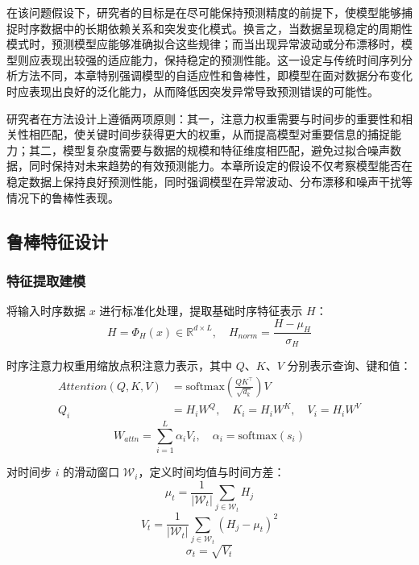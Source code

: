 在该问题假设下，研究者的目标是在尽可能保持预测精度的前提下，使模型能够捕捉时序数据中的长期依赖关系和突发变化模式。换言之，当数据呈现稳定的周期性模式时，预测模型应能够准确拟合这些规律；而当出现异常波动或分布漂移时，模型则应表现出较强的适应能力，保持稳定的预测性能。这一设定与传统时间序列分析方法不同，本章特别强调模型的自适应性和鲁棒性，即模型在面对数据分布变化时应表现出良好的泛化能力，从而降低因突发异常导致预测错误的可能性。

研究者在方法设计上遵循两项原则：其一，注意力权重需要与时间步的重要性和相关性相匹配，使关键时间步获得更大的权重，从而提高模型对重要信息的捕捉能力；其二，模型复杂度需要与数据的规模和特征维度相匹配，避免过拟合噪声数据，同时保持对未来趋势的有效预测能力。本章所设定的假设不仅考察模型能否在稳定数据上保持良好预测性能，同时强调模型在异常波动、分布漂移和噪声干扰等情况下的鲁棒性表现。

\subsection{鲁棒特征设计}\label{sec:ch3-robust-feature}

\subsubsection{特征提取建模}\label{subsec:ch3-feature-extraction}

将输入时序数据 \(x\) 进行标准化处理，提取基础时序特征表示 \(H\)：
\begin{equation}
H = \Phi_{H}(x) \in \mathbb{R}^{d \times L},\quad H_{norm} = \frac{H - \mu_H}{\sigma_H}
\tag{3-3}
\end{equation}

\noindent 时序注意力权重用缩放点积注意力表示，其中 \(Q\)、\(K\)、\(V\) 分别表示查询、键和值：
\begin{align}
Attention(Q, K, V) &= \text{softmax}\left(\frac{QK^{\top}}{\sqrt{d_k}}\right)V
\tag{3-4}\\
Q_i &= H_i W^Q,\quad K_i = H_i W^K,\quad V_i = H_i W^V
\tag{3-5}
\end{align}
\begin{equation}
W_{attn} = \sum_{i=1}^{L} \alpha_i V_i,\quad \alpha_i = \text{softmax}(s_i)
\tag{3-6}
\end{equation}

\noindent 对时间步 \(i\) 的滑动窗口 \(\mathcal{W}_i\)，定义时间均值与时间方差：
\begin{equation}
\mu_t = \frac{1}{|\mathcal{W}_t|}\sum_{j \in \mathcal{W}_t} H_j
\tag{3-7}
\end{equation}
\begin{equation}
V_t = \frac{1}{|\mathcal{W}_t|}\sum_{j \in \mathcal{W}_t} (H_j - \mu_t)^2
\tag{3-8}
\end{equation}
\begin{equation}
\sigma_t = \sqrt{V_t}
\tag{3-9}
\end{equation}

